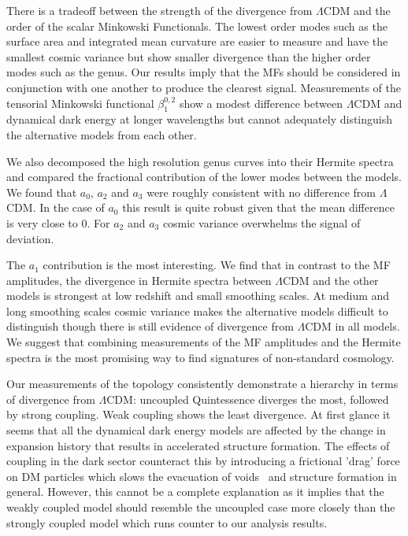 \documentclass[a4paper,fleqn,usenatbib]{mnras}
\begin{document}
There is a tradeoff between the strength of the divergence from $\Lambda$CDM and the order of the scalar Minkowski Functionals. The lowest order modes such as the surface area and integrated mean curvature are easier to measure and have the smallest cosmic variance but show smaller divergence than the higher order modes such as the genus. Our results imply that the MFs should be considered in conjunction with one another to produce the clearest signal. Measurements of the tensorial Minkowski functional $\beta_1^{0,2}$ show a modest difference between $\Lambda$CDM and dynamical dark energy at longer wavelengths but cannot adequately distinguish the alternative models from each other.

We also decomposed the high resolution genus curves into their Hermite spectra and compared the fractional contribution of the lower modes between the models. We found that $a_0$, $a_2$ and $a_3$ were roughly consistent with no difference from $\Lambda$CDM. In the case of $a_0$ this result is quite robust given that the mean difference is very close to 0. For $a_2$ and $a_3$ cosmic variance overwhelms the signal of deviation.

The $a_1$ contribution is the most interesting. We find that in contrast to the MF amplitudes, the divergence in Hermite spectra between $\Lambda$CDM and the other models is strongest at low redshift and small smoothing scales. At medium and long smoothing scales cosmic variance makes the alternative models difficult to distinguish though there is still evidence of divergence from $\Lambda$CDM in all models. We suggest that combining measurements of the MF amplitudes and the Hermite spectra is the most promising way to find signatures of non-standard cosmology.

Our measurements of the topology consistently demonstrate a hierarchy in terms of divergence from $\Lambda$CDM: uncoupled Quintessence diverges the most, followed by strong coupling. Weak coupling shows the least divergence. At first glance it seems that all the dynamical dark energy models are affected by the change in expansion history that results in accelerated structure formation. The effects of coupling in the dark sector counteract this by introducing a frictional 'drag' force on DM particles which slows the evacuation of voids~\citep{2017MNRAS.468.3381A} and structure formation in general. However, this cannot be a complete explanation as it implies that the weakly coupled model should resemble the uncoupled case more closely than the strongly coupled model which runs counter to our analysis results. 
\end{document}
